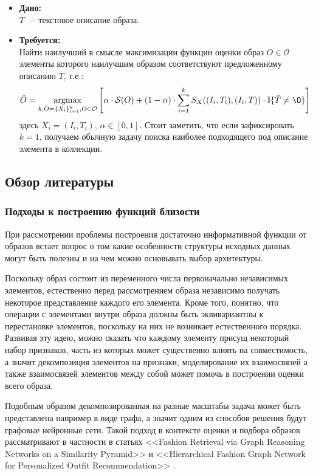 \documentclass[a4paper,12pt]{article}
\DeclareMathOperator*{\argmax}{argmax}
\begin{document}
				\begin{itemize}
					\item \textbf{Дано:}\\
					$T$ --- текстовое описание образа.
					
					\item \textbf{Требуется:}\\
					Найти наилучший в смысле максимизации функции оценки образ $O\in\mathcal{O}$ элементы которого наилучшим образом соответствуют предложенному описанию $T$, т.е.:
					$$ \hat{O} = \argmax_{k,O = \{X_i\}_{i=1}^{k},  O\in\mathcal{O}} \left[\alpha \cdot \mathcal{S}(O) + (1-\alpha) \cdot \sum\limits_{i=1}^{k} S_X((I_i, T_i), (I_i, T))\cdot\mathbb{I}\{\hat{T}\neq\O\}  \right]$$				
					здесь $X_i = (I_i, T_i)$, $\alpha\in[0,1]$. 
					Стоит заметить, что если зафиксировать $k=1$, получаем обычную задачу поиска наиболее подходящего под описание элемента в коллекции.
				\end{itemize}
			
		\subsection{Обзор литературы}
			\subsubsection{Подходы к построению функций близости}
				При рассмотрении проблемы построения достаточно информативной функции от образов встает вопрос о том какие особенности структуры исходных данных могут быть полезны и на чем можно основывать выбор архитектуры. 
				
				Поскольку образ состоит из переменного числа первоначально независимых элементов, естественно перед рассмотрением образа независимо получать некоторое представление каждого его элемента. Кроме того, понятно, что операции с элементами внутри образа должны быть эквивариантны к перестановке элементов, поскольку на них не возникает естественного порядка. Развивая эту идею, можно сказать что каждому элементу присущ некоторый набор признаков, часть из которых может существенно влиять на совместимость, а значит декомпозиция элементов на признаки, моделирование их взаимосвязей а также взаимосвязей элементов между собой может помочь в построении оценки всего образа. 
				
				Подобным образом декомпозированная на разные масштабы задача может быть представлена например в виде графа, а значит одним из способов решения будут графовые нейронные сети. Такой подход в контексте оценки и подбора образов рассматривают в частности в статьях <<Fashion Retrieval via Graph Reasoning Networks on a Similarity
				Pyramid>> \cite{https://doi.org/10.48550/arXiv.1908.11754} и <<Hierarchical Fashion Graph Network for Personalized Outfit
				Recommendation>> \cite{https://doi.org/10.48550/arXiv.2005.12566}. \\
				
\end{document}
